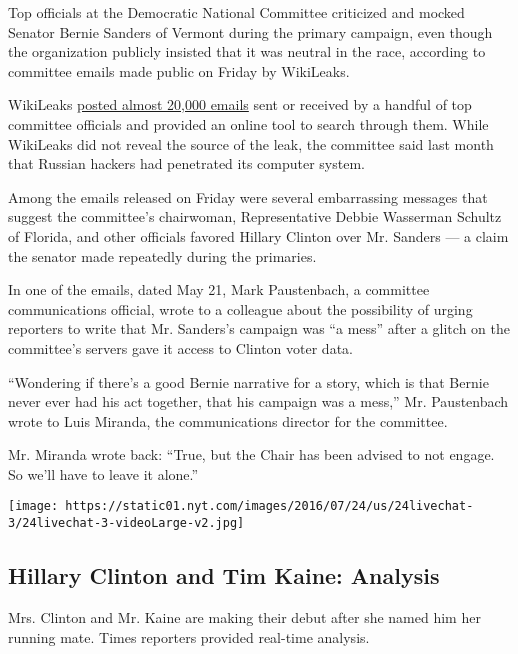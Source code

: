 Top officials at the Democratic National Committee criticized and mocked
Senator Bernie Sanders of Vermont during the primary campaign, even
though the organization publicly insisted that it was neutral in the
race, according to committee emails made public on Friday by WikiLeaks.

WikiLeaks \href{https://wikileaks.com/dnc-emails/}{posted almost 20,000
emails} sent or received by a handful of top committee officials and
provided an online tool to search through them. While WikiLeaks did not
reveal the source of the leak, the committee said last month that
Russian hackers had penetrated its computer system.

Among the emails released on Friday were several embarrassing messages
that suggest the committee's chairwoman, Representative Debbie Wasserman
Schultz of Florida, and other officials favored Hillary Clinton over Mr.
Sanders --- a claim the senator made repeatedly during the primaries.

In one of the emails, dated May 21, Mark Paustenbach, a committee
communications official, wrote to a colleague about the possibility of
urging reporters to write that Mr. Sanders's campaign was ``a mess''
after a glitch on the committee's servers gave it access to Clinton
voter data.

``Wondering if there's a good Bernie narrative for a story, which is
that Bernie never ever had his act together, that his campaign was a
mess,'' Mr. Paustenbach wrote to Luis Miranda, the communications
director for the committee.

Mr. Miranda wrote back: ``True, but the Chair has been advised to not
engage. So we'll have to leave it alone.''

\href{https://www.nytimes.com/interactive/2016/07/23/us/elections/hillary-clinton-tim-kaine-vp.html}{}

\texttt{[image: https://static01.nyt.com/images/2016/07/24/us/24livechat-3/24livechat-3-videoLarge-v2.jpg]}

\hypertarget{hillary-clinton-and-tim-kaine-analysis}{%
\subsection{Hillary Clinton and Tim Kaine:
Analysis}\label{hillary-clinton-and-tim-kaine-analysis}}

Mrs. Clinton and Mr. Kaine are making their debut after she named him
her running mate. Times reporters provided real-time analysis.

